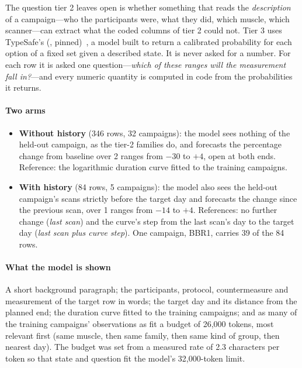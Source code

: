 The question tier 2 leaves open is whether something that reads the \emph{description} of a campaign---who the
participants were, what they did, which muscle, which scanner---can extract what the coded columns of tier 2 could not.
Tier 3 uses TypeSafe's \Jev{} (, pinned)~\citep{typesafe2026}, a model built to return a
calibrated probability for each option of a fixed set given a described state. It is never asked for a number. For
each row it is asked one question---\emph{which of these ranges will the measurement fall in?}---and every numeric
quantity is computed in code from the probabilities it returns.

\paragraph{Two arms}
\begin{itemize}
  \item \textbf{Without history} (346 rows, 32 campaigns): the model sees nothing of the held-out campaign, as the
        tier-2 families do, and forecasts the percentage change from baseline over 2\pp{} ranges from $-30$ to
        $+4$, open at both ends. Reference: the logarithmic duration curve fitted to the training campaigns.
  \item \textbf{With history} (84 rows, 5 campaigns): the model also sees the held-out campaign's scans strictly
        before the target day and forecasts the change since the previous scan, over 1\pp{} ranges from $-14$ to
        $+4$. References: no further change (\emph{last scan}) and the curve's step from the last scan's day to the
        target day (\emph{last scan plus curve step}). One campaign, BBR1, carries 39 of the 84 rows.
\end{itemize}

\paragraph{What the model is shown} A short background paragraph; the participants, protocol, countermeasure and
measurement of the target row in words; the target day and its distance from the planned end; the duration curve
fitted to the training campaigns; and as many of the training campaigns' observations as fit a budget of 26,000
tokens, most relevant first (same muscle, then same family, then same kind of group, then nearest day). The budget
was set from a measured rate of 2.3 characters per token so that state and question fit the model's 32,000-token
limit.

